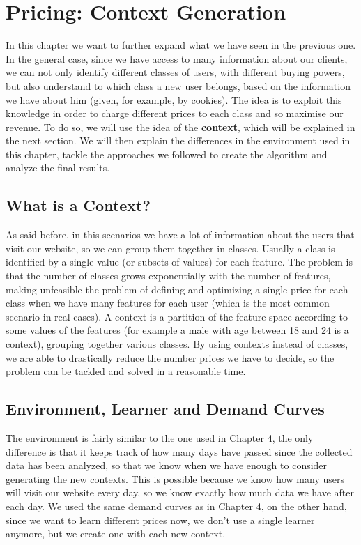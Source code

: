 \chapter{Pricing: Context Generation}\label{ch:pricing:-context-generation}

In this chapter we want to further expand what we have seen in the previous one.
In the general case, since we have access to many information about our clients, we can not only identify different classes of users, with different buying powers, but also understand to which class a new user belongs, based on the information we have about him (given, for example, by cookies).
The idea is to exploit this knowledge in order to charge different prices to each class and so maximise our revenue.
To do so, we will use the idea of the \textbf{context}, which will be explained in the next section.
We will then explain the differences in the environment used in this chapter, tackle the approaches we followed to create the algorithm and analyze the final results.

\section{What is a Context?}\label{sec:what-is-a-context?}
As said before, in this scenarios we have a lot of information about the users that visit our website, so we can group them together in classes.
Usually a class is identified by a single value (or subsets of values) for each feature.
The problem is that the number of classes grows exponentially with the number of features, making unfeasible the problem of defining and optimizing a single price for each class when we have many features for each user (which is the most common scenario in real cases).
A context is a partition of the feature space according to some values of the features (for example a male with age between 18 and 24 is a context), grouping together various classes.
By using contexts instead of classes, we are able to drastically reduce the number prices we have to decide, so the problem can be tackled and solved in a reasonable time.

\section{Environment, Learner and Demand Curves}\label{sec:environment,-learner-and-demand-curves}
The environment is fairly similar to the one used in Chapter 4, the only difference is that it keeps track of how many days have passed since the collected data has been analyzed, so that we know when we have enough to consider generating the new contexts.
This is possible because we know how many users will visit our website every day, so we know exactly how much data we have after each day.
We used the same demand curves as in Chapter 4, on the other hand, since we want to learn different prices now, we don't use a single learner anymore, but we create one with each new context.

